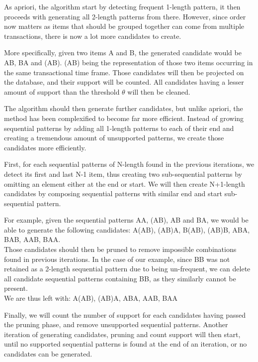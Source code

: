 \documentclass{eplmastersthesis}
\begin{document}
As apriori, the algorithm start by detecting frequent 1-length pattern, it then proceeds with generating all 2-length patterns from there. However, since order now matters as items that should be grouped together can come from multiple transactions, there is now a lot more candidates to create. \newline

More specifically, given two items A and B, the generated candidate would be AB, BA and (AB). (AB) being the representation of those two items occurring in the same transactional time frame. Those candidates will then be projected on the database, and their support will be counted. All candidates having a lesser amount of support than the threshold $\theta$ will then be cleaned. \newline

The algorithm should then generate further candidates, but unlike apriori, the method has been complexified to become far more efficient. Instead of growing sequential patterns by adding all 1-length patterns to each of their end and creating a tremendous amount of unsupported patterns, we create those candidates more efficiently. \newline

First, for each sequential patterns of N-length found in the previous iterations, we detect its first and last N-1 item, thus creating two sub-sequential patterns by omitting an element either at the end or start. We will then create N+1-length candidates by composing sequential patterns with similar end and start sub-sequential pattern. \newline

For example, given the sequential patterns AA, (AB), AB and BA, we would be able to generate the following candidates: A(AB), (AB)A, B(AB), (AB)B, ABA, BAB, AAB, BAA. \\
Those candidates should then be pruned to remove impossible combinations found in previous iterations. In the case of our example, since BB was not retained as a 2-length sequential pattern due to being un-frequent, we can delete all candidate sequential patterns containing BB, as they similarly cannot be present. \\
We are thus left with: A(AB), (AB)A, ABA, AAB, BAA \newline

Finally, we will count the number of support for each candidates having passed the pruning phase, and remove unsupported sequential patterns. Another iteration of generating candidates, pruning and count support will then start, until no supported sequential patterns is found at the end of an iteration, or no candidates can be generated. \newline
\end{document}
